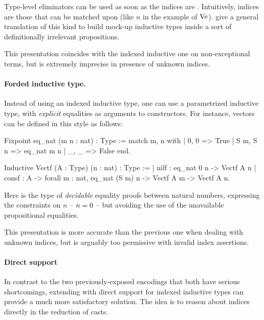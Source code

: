 Type-level eliminators can be used as soon as the indices are  . Intuitively,  indices
are those that can be matched upon (like $n$ in the example of $\operatorname{Ve}$).
 give a general translation of this kind
to build mock-up inductive types inside a sort of definitionally irrelevant propositions.

This presentation coincides with the indexed inductive one 
on non-exceptional terms, but is extremely imprecise in presence of unknown indices.

\paragraph{Forded inductive type.}

Instead of using an indexed inductive type, one can use a parametrized inductive type, with \emph{explicit} equalities as arguments to constructors.%
%
For instance, vectors can be defined in this style as follows:
\begin{coqcode}
  Fixpoint eq_nat (m n : nat) : Type :=
  match m, n with
  | 0, 0 => True
  | S m, S n => eq_nat m n
  | _, _ => False
  end.

  Inductive Vectf (A : Type) (n : nat) : Type :=
  | nilf : eq_nat 0 n -> Vectf A n
  | consf : A -> forall m : nat, eq_nat (S m) n
      -> Vectf A m -> Vectf A n.
\end{coqcode}

Here  is the type of \emph{decidable} equality proofs between natural numbers,
expressing the constraints on $n$ – \eg $\eqty{n}{0}$ – but avoiding the use of the unavailable propositional equalities.

This presentation is more accurate than the previous one when dealing with unknown indices,
but is arguably too permissive with invalid index assertions. 

\paragraph{Direct support}

In contrast to the two previously-exposed encodings that both have serious shortcomings, 
extending  with direct support for indexed inductive types can provide a
much more satisfactory solution. The idea is to reason about indices directly in
the reduction of casts. 

